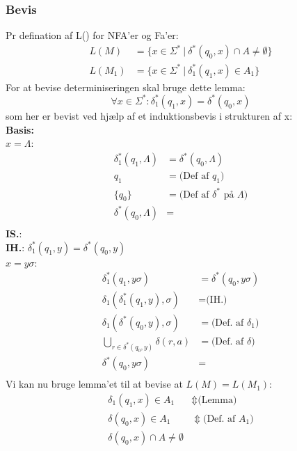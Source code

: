\documentclass[a4, danish]{article}
\begin{document}
\subsubsection{Bevis}
  Pr defination af L() for NFA'er og Fa'er: 
  \begin{align*}
    L(M)&=\{  x\in \Sigma^* \ | \ \delta^*(q_0,x) \cap A \neq \emptyset \} \\
    L(M_1)&=\{ x\in \Sigma ^* \ | \ \delta_1^*(q_1,x)\in A_1 \} 
  \end{align*}
  For at bevise determiniseringen skal bruge dette lemma:
  \begin{equation*}
  \forall x \in \Sigma^*: \delta_1^*(q_1,x) =  \delta^*(q_0,x)
  \end{equation*}
  som her er bevist ved hjælp af et induktionsbevis i strukturen af x: \\
  \textbf{Basis:} \\
  $x=\Lambda$:
  \begin{align*}
    \delta^*_1(q_1,\Lambda) &=  \delta^*(q_0,\Lambda) \\
    q_1 &= \text{(Def af $q_1$)} \\
    \{q_0\} &= \text{(Def af $\delta^*$ på $\Lambda$)} \\
    \delta^*(q_0,\Lambda) &= \\
  \end{align*}
  \textbf{IS.}: \\
  \textbf{IH.}: $\delta_1^*(q_1,y) =  \delta^*(q_0,y)$ \\
  $x=y\sigma$:
  \begin{align*}
    \delta_1^*(q_1,y\sigma)&=\delta^*(q_0,y\sigma) \\
    \delta_1(\delta_1^*(q_1,y),\sigma) &= \text{(IH.)} \\
    \delta_1(\delta^*(q_0,y),\sigma) &= \text{(Def. af $\delta_1$)}\\
    \bigcup_{r\in \delta^*(q_0,y)}\delta(r,a) &= \text{(Def. af $\delta$)}\\
    \delta^*(q_0,y\sigma) &= \\
  \end{align*}
  Vi kan nu bruge lemma'et til at bevise at $L(M)=L(M_1)$:
  \begin{align*}
    \delta_1(q_1,x)\in A_1 &\Updownarrow \text{(Lemma)} \\  
    \delta(q_0,x)\in A_1 &\Updownarrow \text{(Def. af $A_1$)} \\
    \delta(q_0,x)\cap A \neq \emptyset \\
  \end{align*}
   
\end{document}
